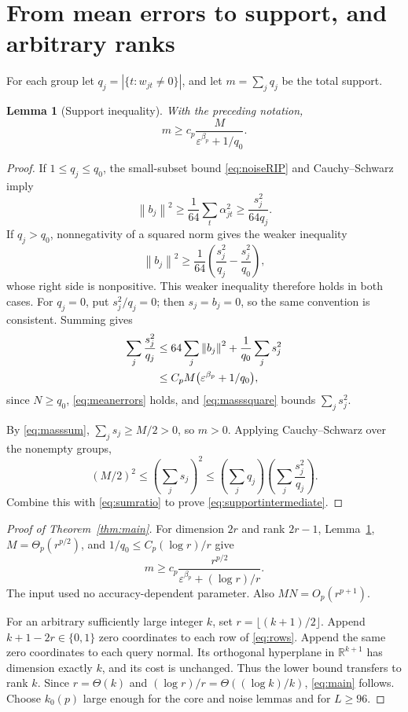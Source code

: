 \documentclass[11pt,letterpaper]{article}
\newtheorem{lemma}[theorem]{Lemma}
\theoremstyle{definition}
\theoremstyle{remark}
\numberwithin{equation}{section}
\newcommand{\R}{\mathbb R}
\newcommand{\eps}{\varepsilon}
\newcommand{\norm}[1]{\left\lVert#1\right\rVert}
\begin{document}
\section{From mean errors to support, and arbitrary ranks}\label{sec:support}
For each group let $q_j=|\{t:w_{jt}\ne0\}|$, and let $m=\sum_jq_j$ be the total support.

\begin{lemma}[Support inequality]\label{lem:support}
With the preceding notation,
\begin{equation}\label{eq:supportintermediate}
 m\ge c_p\frac{M}{\eps^{\beta_p}+1/q_0}.
\end{equation}
\end{lemma}
\begin{proof}
If $1\le q_j\le q_0$, the small-subset bound \eqref{eq:noiseRIP} and Cauchy--Schwarz imply
\[
 \norm{b_j}^2\ge\frac1{64}\sum_t\alpha_{jt}^2
 \ge\frac{s_j^2}{64q_j}.
\]
If $q_j>q_0$, nonnegativity of a squared norm gives the weaker inequality
\[
 \norm{b_j}^2\ge\frac1{64}\left(\frac{s_j^2}{q_j}-\frac{s_j^2}{q_0}\right),
\]
whose right side is nonpositive. This weaker inequality therefore holds in both cases. For $q_j=0$, put $s_j^2/q_j=0$; then $s_j=b_j=0$, so the same convention is consistent. Summing gives
\begin{align}
 \sum_j\frac{s_j^2}{q_j}
 &\le64\sum_j\norm{b_j}^2+\frac1{q_0}\sum_js_j^2\notag\\
 &\le C_pM\bigl(\eps^{\beta_p}+1/q_0\bigr),\label{eq:sumratio}
\end{align}
since $N\ge q_0$, \eqref{eq:meanerrors} holds, and \eqref{eq:masssquare} bounds $\sum_js_j^2$.

By \eqref{eq:masssum}, $\sum_js_j\ge M/2>0$, so $m>0$. Applying Cauchy--Schwarz over the nonempty groups,
\[
 (M/2)^2\le\left(\sum_js_j\right)^2
 \le\left(\sum_jq_j\right)\left(\sum_j\frac{s_j^2}{q_j}\right).
\]
Combine this with \eqref{eq:sumratio} to prove \eqref{eq:supportintermediate}.
\end{proof}

\begin{proof}[Proof of Theorem~\ref{thm:main}]
For dimension $2r$ and rank $2r-1$, Lemma~\ref{lem:support}, $M=\Theta_p(r^{p/2})$, and $1/q_0\le C_p(\log r)/r$ give
\[
 m\ge c_p\frac{r^{p/2}}{\eps^{\beta_p}+(\log r)/r}.
\]
The input used no accuracy-dependent parameter. Also $MN=O_p(r^{p+1})$.

For an arbitrary sufficiently large integer $k$, set $r=\lfloor(k+1)/2\rfloor$. Append $k+1-2r\in\{0,1\}$ zero coordinates to each row of \eqref{eq:rows}. Append the same zero coordinates to each query normal. Its orthogonal hyperplane in $\R^{k+1}$ has dimension exactly $k$, and its cost is unchanged. Thus the lower bound transfers to rank $k$. Since $r=\Theta(k)$ and $(\log r)/r=\Theta((\log k)/k)$, \eqref{eq:main} follows. Choose $k_0(p)$ large enough for the core and noise lemmas and for $L\ge96$.
\end{proof}
\end{document}
